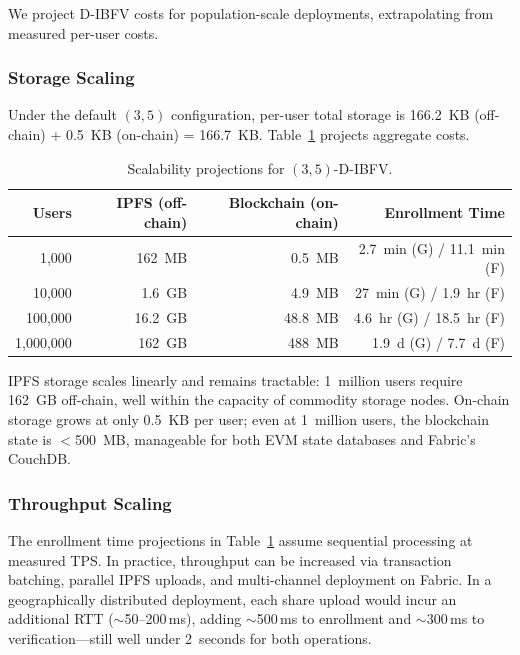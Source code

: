\documentclass[3p,twocolumn]{elsarticle}
\newcommand{\DIBFV}{\textsf{D-IBFV}}
\begin{document}
We project \DIBFV{} costs for population-scale deployments, extrapolating from measured per-user costs.

\subsubsection{Storage Scaling}
Under the default $(3,5)$ configuration, per-user total storage is 166.2~KB (off-chain) + 0.5~KB (on-chain) = 166.7~KB. Table~\ref{tab:scalability} projects aggregate costs.

\begin{table}[t]
\centering
\caption{Scalability projections for $(3,5)$-\DIBFV{}.}
\label{tab:scalability}
\begin{tabular}{@{}r r r r@{}}
\toprule
\textbf{Users} & \textbf{IPFS (off-chain)} & \textbf{Blockchain (on-chain)} & \textbf{Enrollment Time} \\
\midrule
1{,}000 & 162~MB & 0.5~MB & 2.7~min (G) / 11.1~min (F) \\
10{,}000 & 1.6~GB & 4.9~MB & 27~min (G) / 1.9~hr (F) \\
100{,}000 & 16.2~GB & 48.8~MB & 4.6~hr (G) / 18.5~hr (F) \\
1{,}000{,}000 & 162~GB & 488~MB & 1.9~d (G) / 7.7~d (F) \\
\bottomrule
\end{tabular}
\end{table}

IPFS storage scales linearly and remains tractable: 1~million users require 162~GB off-chain, well within the capacity of commodity storage nodes. On-chain storage grows at only 0.5~KB per user; even at 1~million users, the blockchain state is $<$500~MB, manageable for both EVM state databases and Fabric's CouchDB.

\subsubsection{Throughput Scaling}
The enrollment time projections in Table~\ref{tab:scalability} assume sequential processing at measured TPS. In practice, throughput can be increased via transaction batching, parallel IPFS uploads, and multi-channel deployment on Fabric. In a geographically distributed deployment, each share upload would incur an additional RTT ($\sim$50--200\,ms), adding $\sim$500\,ms to enrollment and $\sim$300\,ms to verification---still well under 2~seconds for both operations.

\end{document}
